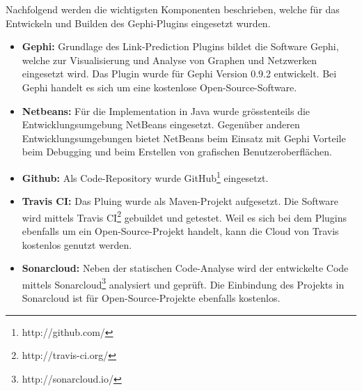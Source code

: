 Nachfolgend werden die wichtigsten Komponenten beschrieben, welche für das Entwickeln und Builden des Gephi-Plugins eingesetzt wurden.

\begin{itemize}
    \item \textbf{Gephi:} Grundlage des Link-Prediction Plugins bildet die Software Gephi, welche zur Visualisierung und Analyse von Graphen und Netzwerken eingesetzt wird. Das Plugin wurde für Gephi Version 0.9.2 entwickelt. Bei Gephi handelt es sich um eine kostenlose Open-Source-Software. %
    \item \textbf{Netbeans:} Für die Implementation in Java wurde grösstenteils die Entwicklungsumgebung NetBeans eingesetzt. Gegenüber anderen Entwicklungsumgebungen bietet NetBeans beim Einsatz mit Gephi Vorteile beim Debugging und beim Erstellen von grafischen Benutzeroberflächen.
    \item \textbf{Github:} Als Code-Repository wurde GitHub\footnote{http://github.com/} eingesetzt.
    \item \textbf{Travis CI:} Das Pluing wurde als Maven-Projekt aufgesetzt. Die Software wird mittels Travis CI\footnote{http://travis-ci.org/} gebuildet und getestet. Weil es sich bei dem Plugins ebenfalls um ein Open-Source-Projekt handelt, kann die Cloud von Travis kostenlos genutzt werden.
    \item \textbf{Sonarcloud:} Neben der statischen Code-Analyse wird der entwickelte Code mittels Sonarcloud\footnote{http://sonarcloud.io/} analysiert und geprüft. Die Einbindung des Projekts in Sonarcloud ist für Open-Source-Projekte ebenfalls kostenlos.
\end{itemize}
